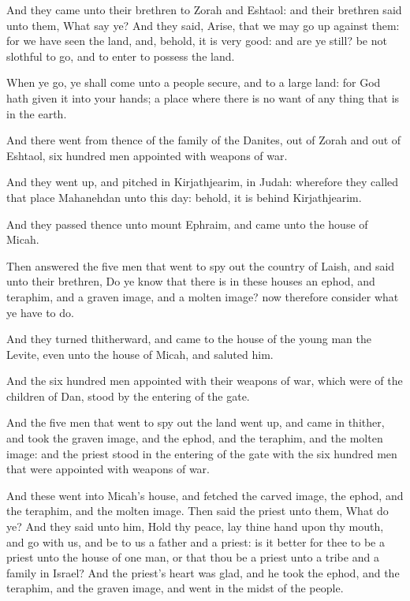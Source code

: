 \Verse And they came unto their brethren to Zorah and Eshtaol: and their brethren said unto them, What say ye?  \Verse And they said, Arise, that we may go up against them: for we have seen the land, and, behold, it is very good: and are ye still? be not slothful to go, and to enter to possess the land.

\Verse When ye go, ye shall come unto a people secure, and to a large land: for God hath given it into your hands; a place where there is no want of any thing that is in the earth.

\Verse And there went from thence of the family of the Danites, out of Zorah and out of Eshtaol, six hundred men appointed with weapons of war.

\Verse And they went up, and pitched in Kirjathjearim, in Judah: wherefore they called that place Mahanehdan unto this day: behold, it is behind Kirjathjearim.

\Verse And they passed thence unto mount Ephraim, and came unto the house of Micah.

\Verse Then answered the five men that went to spy out the country of Laish, and said unto their brethren, Do ye know that there is in these houses an ephod, and teraphim, and a graven image, and a molten image?  now therefore consider what ye have to do.

\Verse And they turned thitherward, and came to the house of the young man the Levite, even unto the house of Micah, and saluted him.

\Verse And the six hundred men appointed with their weapons of war, which were of the children of Dan, stood by the entering of the gate.

\Verse And the five men that went to spy out the land went up, and came in thither, and took the graven image, and the ephod, and the teraphim, and the molten image: and the priest stood in the entering of the gate with the six hundred men that were appointed with weapons of war.

\Verse And these went into Micah's house, and fetched the carved image, the ephod, and the teraphim, and the molten image. Then said the priest unto them, What do ye?  \Verse And they said unto him, Hold thy peace, lay thine hand upon thy mouth, and go with us, and be to us a father and a priest: is it better for thee to be a priest unto the house of one man, or that thou be a priest unto a tribe and a family in Israel?  \Verse And the priest's heart was glad, and he took the ephod, and the teraphim, and the graven image, and went in the midst of the people.

